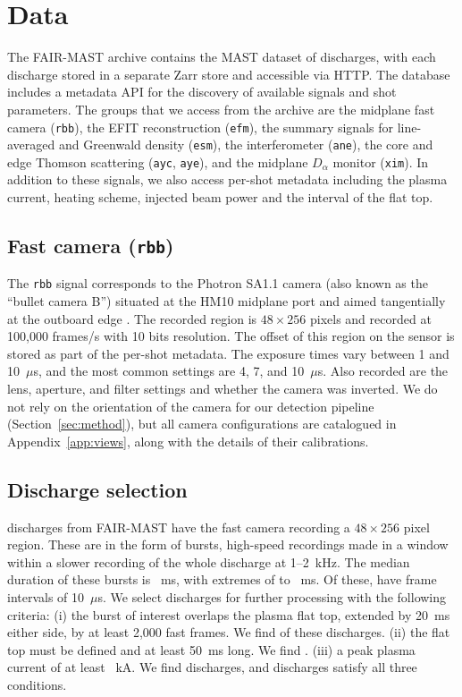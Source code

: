 \section{Data}
\label{sec:data}

The FAIR-MAST archive \citep{jackson2024fairmast} contains the MAST dataset of \nArchiveShots{} discharges, with each discharge stored in a separate Zarr store and accessible via HTTP. The database includes a metadata API for the discovery of available signals and shot parameters. The groups that we access from the archive are the midplane fast camera (\texttt{rbb}), the EFIT reconstruction (\texttt{efm}), the summary signals for line-averaged and Greenwald density (\texttt{esm}), the interferometer (\texttt{ane}), the core and edge Thomson scattering (\texttt{ayc}, \texttt{aye}), and the midplane $D_\alpha$ monitor (\texttt{xim}). In addition to these signals, we also access per-shot metadata including the plasma current, heating scheme, injected beam power and the interval of the flat top.

\subsection{Fast camera (\texttt{rbb})}
The \texttt{rbb} signal corresponds to the Photron SA1.1 camera (also known as the ``bullet camera B'') situated at the HM10 midplane port and aimed tangentially at the outboard edge \citep{kirk2016filaments, farley2019identification}. The recorded region is $48 \times 256$ pixels and recorded at 100{,}000 frames/s with 10 bits resolution. The offset of this region on the sensor is stored as part of the per-shot metadata. The exposure times vary between 1 and 10~$\mu$s, and the most common settings are 4, 7, and 10~$\mu$s. Also recorded are the lens, aperture, and filter settings and whether the camera was inverted. We do not rely on the orientation of the camera for our detection pipeline (Section~\ref{sec:method}), but all camera configurations are catalogued in Appendix~\ref{app:views}, along with the details of their calibrations.

\subsection{Discharge selection}
\nStripShots{} discharges from FAIR-MAST have the fast camera recording a $48 \times 256$ pixel region. These are in the form of bursts, high-speed recordings made in a window within a slower recording of the whole discharge at 1--2~kHz. The median duration of these bursts is \burstMedianMs{}~ms, with extremes of \burstMinMs{} to \burstMaxMs{}~ms. Of these, \nStripTenUs{} have frame intervals of 10~$\mu$s. We select discharges for further processing with the following criteria: (i) the burst of interest overlaps the plasma flat top, extended by 20~ms either side, by at least 2{,}000 fast frames. We find \nOkBurst{} of these discharges. (ii) the flat top must be defined and at least 50~ms long. We find \nOkFlatTop. (iii) a peak plasma current of at least \ipCandMin{}~kA. We find \nOkCurrent{} discharges, and \nShotsCandidates{} discharges satisfy all three conditions.

